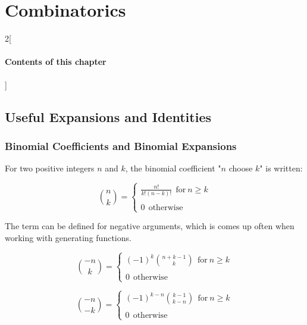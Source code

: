 \chapter{Combinatorics}

\begin{multicols}{2}[\subsubsection*{Contents of this chapter}]
\end{multicols}



\section{Useful Expansions and Identities}



\subsection{Binomial Coefficients and Binomial Expansions}

For two positive integers $n$ and $k$, the binomial coefficient "$n$ choose $k$" is written:

\begin{equation}
{n \choose k} = \left\{ \begin{array}{c} 
\frac{n!}{k!(n-k)!}\ \ \mathrm{for\ }n\geq k\\
\\
0 \ \ \mathrm{otherwise}
\end{array}\right.
\end{equation}

The term can be defined for negative arguments, which is comes up often when working with generating functions.

\begin{equation}
{-n \choose k} = \left\{\begin{array}{c}
(-1)^k { n+k-1 \choose k}\ \ \mathrm{for\ }n\geq k\\
\\
0 \ \ \mathrm{otherwise}
\end{array}\right.
\end{equation}


\begin{equation}
{-n \choose -k} = \left\{\begin{array}{c}
(-1)^{k-n} {k-1 \choose k-n}\ \ \mathrm{for\ }n\geq k\\
\\
0 \ \ \mathrm{otherwise}
\end{array}\right.
\end{equation}

